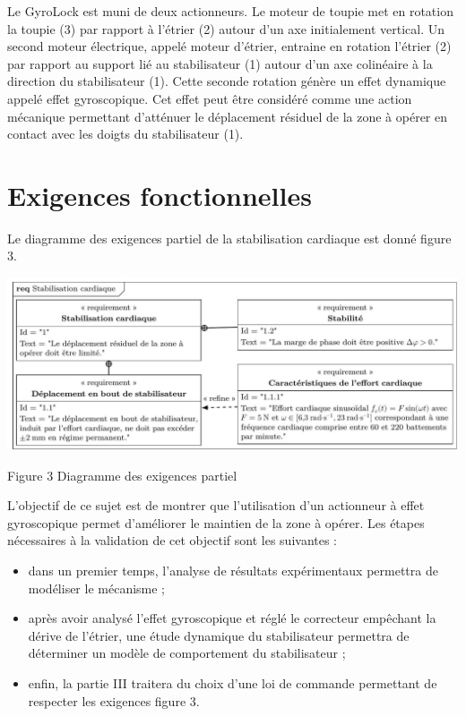 \documentclass[10pt]{article}
\begin{document}
Le GyroLock est muni de deux actionneurs. Le moteur de toupie met en rotation la toupie (3) par rapport à l'étrier (2) autour d'un axe initialement vertical. Un second moteur électrique, appelé moteur d'étrier, entraine en rotation l'étrier (2) par rapport au support lié au stabilisateur (1) autour d'un axe colinéaire à la direction du stabilisateur (1). Cette seconde rotation génère un effet dynamique appelé effet gyroscopique. Cet effet peut être considéré comme une action mécanique permettant d'atténuer le déplacement résiduel de la zone à opérer en contact avec les doigts du stabilisateur (1).

\section{Exigences fonctionnelles}
Le diagramme des exigences partiel de la stabilisation cardiaque est donné figure 3.

\begin{center}
\includegraphics[max width=\textwidth]{2023_07_26_54f5e859400a10e656ddg-02(1)}
\end{center}

Figure 3 Diagramme des exigences partiel

L'objectif de ce sujet est de montrer que l'utilisation d'un actionneur à effet gyroscopique permet d'améliorer le maintien de la zone à opérer. Les étapes nécessaires à la validation de cet objectif sont les suivantes :

\begin{itemize}
  \item dans un premier temps, l'analyse de résultats expérimentaux permettra de modéliser le mécanisme ;

  \item après avoir analysé l'effet gyroscopique et réglé le correcteur empêchant la dérive de l'étrier, une étude dynamique du stabilisateur permettra de déterminer un modèle de comportement du stabilisateur ;

  \item enfin, la partie III traitera du choix d'une loi de commande permettant de respecter les exigences figure 3.

\end{itemize}
\end{document}
